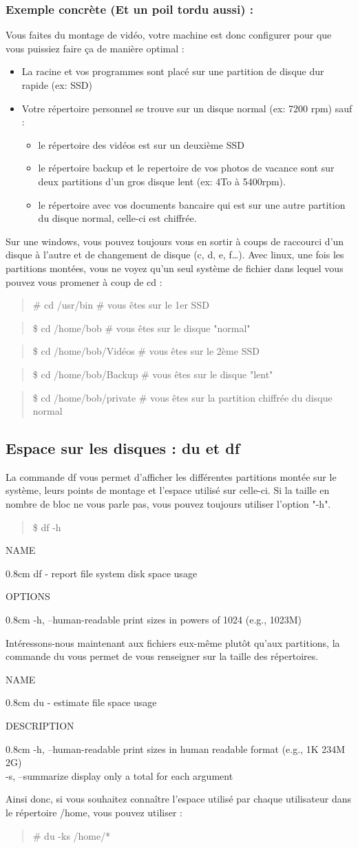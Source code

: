 \documentclass[a4paper]{article}
\newcommand{\commande}[1] {
    \begin{quote}
    \tt\raggedright #1 
    \end{quote}
}
\newcommand{\man}[2]{
    \begin{tcolorbox}[toprule=3mm,width=\textwidth,outer arc=0mm,colbacktitle=grayman,coltitle=black,colback={grayman},colframe={grayman},title={man : \tt #1}]
        \tt\raggedright #2
    \end{tcolorbox}
}
\newcommand{\mandesc}[1]{
    \begin{adjustwidth}{0.8cm}{}
        #1
    \end{adjustwidth}
}
\begin{document}
\subsubsection*{Exemple concrète (Et un poil tordu aussi) :}
\par Vous faites du montage de vidéo, votre machine est donc configurer pour que vous puissiez faire ça de manière optimal :
\begin{itemize}
\item La racine et vos programmes sont placé sur une partition de disque dur rapide (ex: SSD)
\item Votre répertoire personnel se trouve sur un disque normal (ex: 7200 rpm) sauf :
    \begin{itemize}
    \item le répertoire des vidéos est sur un deuxième SSD
    \item le répertoire backup et le repertoire de vos photos de vacance sont sur deux partitions d'un gros disque lent (ex: 4To à 5400rpm).
    \item le répertoire avec vos documents bancaire qui est sur une autre partition du disque normal, celle-ci est chiffrée.
    \end{itemize}
\end{itemize}
\par Sur une windows, vous pouvez toujours vous en sortir à coups de raccourci d'un disque à l'autre et de changement de disque (c, d, e, f\dots). Avec linux, une fois les partitions montées, vous ne voyez qu'un seul système de fichier dans lequel vous pouvez vous promener à coup de cd :
\commande{\# cd /usr/bin \# vous êtes sur le 1er SSD}
\commande{\$ cd /home/bob \# vous êtes sur le disque "normal"}
\commande{\$ cd /home/bob/Vidéos \# vous êtes sur le 2ème SSD}
\commande{\$ cd /home/bob/Backup \# vous êtes sur le disque "lent"}
\commande{\$ cd /home/bob/private \# vous êtes sur la partition chiffrée du disque normal}

\subsection{Espace sur les disques : du et df}
\par La commande df vous permet d'afficher les différentes partitions montée sur le système, leurs points de montage et l'espace utilisé sur celle-ci. Si la taille en nombre de bloc ne vous parle pas, vous pouvez toujours utiliser l'option "-h".
\commande{\$ df -h}
\man{df}{
NAME
\mandesc{df - report file system disk space usage}
OPTIONS
\mandesc{-h, --human-readable print sizes in powers of 1024 (e.g., 1023M)}
}
\par Intéressons-nous maintenant aux fichiers eux-même plutôt qu'aux partitions, la commande du vous permet de vous renseigner sur la taille des répertoires.
\man{du}{
NAME
\mandesc{du - estimate file space usage}
DESCRIPTION
\mandesc{-h, --human-readable print sizes in human readable format (e.g., 1K 234M 2G)\\
-s, --summarize display only a total for each argument}
}
Ainsi donc, si vous souhaitez connaître l'espace utilisé par chaque utilisateur dans le répertoire /home, vous pouvez utiliser :
\commande{\# du -ks /home/*}
\end{document}
